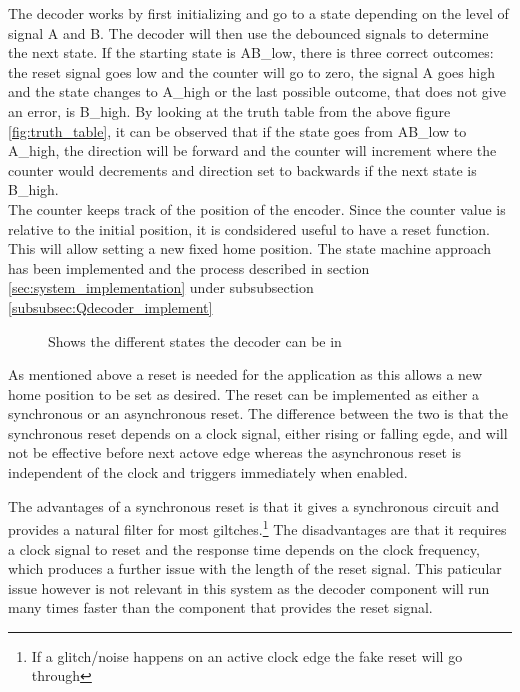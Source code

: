 \documentclass[../../../main]{subfiles}
\begin{document}
The decoder works by first initializing and go to a state depending on the level of signal A and B. The decoder will then use the debounced signals to determine the next state.
If the starting state is AB\_low, there is three correct outcomes: the reset signal goes low and the counter will go to zero, the signal A goes high and the state changes to A\_high or the last possible outcome, that does not give an error, is B\_high. By looking at the truth table from the above figure \ref{fig:truth_table}, it can be observed that if the state goes from AB\_low to A\_high, the direction will be forward and the counter will increment where the counter would decrements and direction set to backwards if the next state is B\_high.\\


The counter keeps track of the position of the encoder. Since the counter value is relative to the initial position, it is condsidered useful to have a reset function. This will allow setting a new fixed home position. The state machine approach has been implemented and the process described in section \ref{sec:system_implementation} under subsubsection \ref{subsubsec:Qdecoder_implement}

\begin{figure}[H]
  \centering
  \def\svgwidth{\columnwidth}
  \fontsize{9}{9}\selectfont
  
  \caption{Shows the different states the decoder can be in}
  \label{fig:state_dia}
\end{figure}
As mentioned above a reset is needed for the application as this allows a new home position to be set as desired. The reset can be implemented as either a synchronous or an asynchronous reset. The difference between the two is that the synchronous reset depends on a clock signal, either rising or falling egde, and will not be effective before next actove edge whereas the asynchronous reset is independent of the clock and triggers immediately when enabled.

The advantages of a synchronous reset is that it gives a synchronous circuit and provides a natural filter for most giltches.\footnote{If a glitch/noise happens on an active clock edge the fake reset will go through}
The disadvantages are that it requires a clock signal to reset and the response time depends on the clock frequency, which produces a further issue with the length of the reset signal.
This paticular issue however is not relevant in this system as the decoder component will run many times faster than the component that provides the reset signal.
\end{document}
